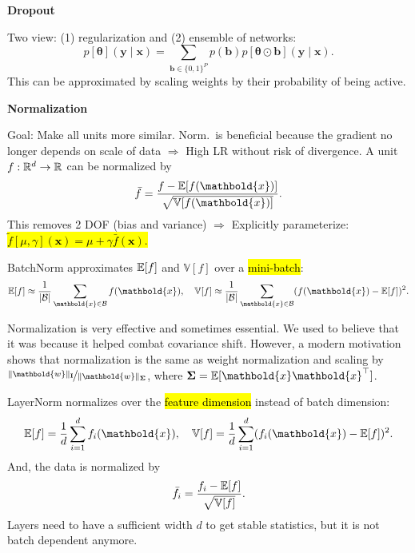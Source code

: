 \documentclass[10pt]{article}
\newenvironment{topic}[1]
{\textbf{\sffamily \footnotesize \colorbox{black}{\rlap{\textbf{\textcolor{white}{#1}}}\hspace{\linewidth}\hspace{-2\fboxsep}}}}
{}
\newenvironment{subtopic}[1]
{\begin{center}\textbf{\footnotesize \sffamily #1}\end{center}}
{}
\renewcommand{\mat}[1]{\ensuremath{\mathbf{#1}}}
\renewcommand{\vec}[1]{\ensuremath{\mathbold{#1}}}
\renewcommand{\Var}{\mathbb{V}}
\begin{document}
\begin{multicols*}{3}
\begin{topic}{Tricks of the trade}
\begin{subtopic}{Dropout}
            Two view: (1) regularization and (2) ensemble of networks: \[
                p[\vec{\theta}](\vec{y} \mid \vec{x}) = \sum_{\vec{b} \in \{ 0,1 \}^P} p(\vec{b}) p[\vec{\theta} \odot \vec{b}](\vec{y} \mid \vec{x}).
            \]
            This can be approximated by scaling weights by their probability of being active.
        \end{subtopic}

        \begin{subtopic}{Normalization}
            Goal: Make all units more similar. Norm.\ is beneficial because the gradient no longer
            depends on scale of data $\Rightarrow$ High LR without risk of divergence. A unit $f: \mathbb{R}^d \to \mathbb{R}$ can be normalized by \[
                \bar{f} = \frac{f - \E[f(\vec{x})]}{\sqrt{\Var[f(\vec{x})]}}.
            \]
            This removes 2 DOF (bias and variance) $\Rightarrow$ Explicitly parameterize: \hl{$\tilde{f}[\mu,\gamma](\vec{x}) = \mu + \gamma \bar{f}(\vec{x})$.}

            BatchNorm approximates $\mathbb{E}[f]$ and $\Var[f]$ over a \hl{mini-batch}: \[
                \E[f] \approx \frac{1}{|\mathcal{B}|} \sum_{\vec{x} \in \mathcal{B}} f(\vec{x}), \quad \Var[f] \approx \frac{1}{|\mathcal{B}|} \sum_{\vec{x} \in \mathcal{B}} (f(\vec{x}) - \E[f])^2.
            \]

            Normalization is very effective and sometimes essential. We used to believe that it was because it
            helped combat covariance shift. However, a modern motivation shows that normalization is the same
            as weight normalization and scaling by $\nicefrac{\| \vec{w} \|_{\mat{I}}}{\| \vec{w}
                \|_{\mat{\Sigma}}}$, where $\mat{\Sigma} = \E[\vec{x}\transpose{\vec{x}}]$.

            LayerNorm normalizes over the \hl{feature dimension} instead of batch dimension: \[
                \E[f] = \frac{1}{d} \sum_{i=1}^{d} f_i(\vec{x}), \quad \Var[f] = \frac{1}{d} \sum_{i=1}^{d} (f_i(\vec{x}) - \E[f])^2.
            \]
            And, the data is normalized by \[
                \bar{f}_i = \frac{f_i - \E[f]}{\sqrt{\Var[f]}}.
            \]
            Layers need to have a sufficient width $d$ to get stable statistics, but it is not batch
            dependent anymore.
        \end{subtopic}


\end{topic}
\end{multicols*}
\end{document}
